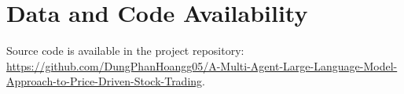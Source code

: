 \section*{Data and Code Availability}
Source code is available in the project repository: \url{https://github.com/DungPhanHoangg05/A-Multi-Agent-Large-Language-Model-Approach-to-Price-Driven-Stock-Trading}.
